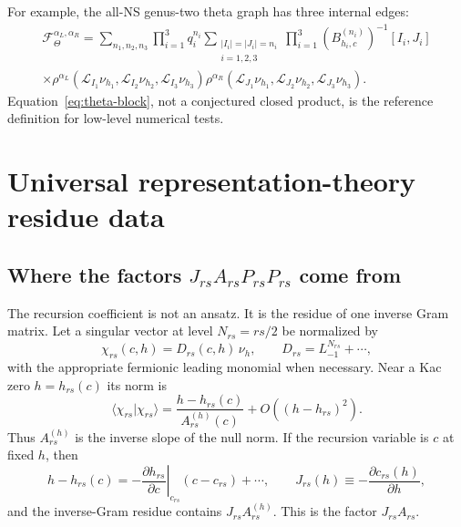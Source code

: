 \documentclass[11pt]{article}
\newcommand{\F}{\mathcal F}
\begin{document}
For example, the all-NS genus-two theta graph has three internal edges:
\begin{multline}
 \F_{\Theta}^{\alpha_L,\alpha_R}
 =\sum_{n_1,n_2,n_3}\prod_{i=1}^{3}q_i^{n_i}
 \sum_{\substack{|I_i|=|J_i|=n_i\\i=1,2,3}}
 \prod_{i=1}^{3}(B^{(n_i)}_{h_i,c})^{-1}[I_i,J_i]
 \\[-0.2em]
 \times\rho^{\alpha_L}
 (\mathcal L_{I_1}\nu_{h_1},
  \mathcal L_{I_2}\nu_{h_2},
  \mathcal L_{I_3}\nu_{h_3})
 \rho^{\alpha_R}
 (\mathcal L_{J_1}\nu_{h_1},
  \mathcal L_{J_2}\nu_{h_2},
  \mathcal L_{J_3}\nu_{h_3}).
 \label{eq:theta-block}
\end{multline}
Equation~\eqref{eq:theta-block}, not a conjectured closed product, is the
reference definition for low-level numerical tests.

\section{Universal representation-theory residue data}
\label{sec:degenerate}

\subsection{\texorpdfstring{Where the factors
$J_{rs}A_{rs}P_{rs}P_{rs}$ come from}{Origin of the J A P factors}}

The recursion coefficient is not an ansatz.  It is the residue of one inverse
Gram matrix.  Let a singular vector at level $N_{rs}=rs/2$ be normalized by
\begin{equation}
 \chi_{rs}(c,h)=D_{rs}(c,h)\,\nu_h,
 \qquad D_{rs}=L_{-1}^{N_{rs}}+\cdots,
 \label{eq:null-normalization}
\end{equation}
with the appropriate fermionic leading monomial when necessary.  Near a Kac
zero $h=h_{rs}(c)$ its norm is
\begin{equation}
 \langle\chi_{rs}|\chi_{rs}\rangle
 =\frac{h-h_{rs}(c)}{A^{(h)}_{rs}(c)}
 +O\!\left((h-h_{rs})^2\right).
 \label{eq:null-norm-slope}
\end{equation}
Thus $A^{(h)}_{rs}$ is the inverse slope of the null norm.  If the recursion
variable is $c$ at fixed $h$, then
\begin{equation}
 h-h_{rs}(c)
 =-\left.\frac{\partial h_{rs}}{\partial c}\right|_{c_{rs}}
 (c-c_{rs})+\cdots,
 \qquad
 J_{rs}(h)\equiv-\frac{\partial c_{rs}(h)}{\partial h},
 \label{eq:jacobian-origin}
\end{equation}
and the inverse-Gram residue contains $J_{rs}A^{(h)}_{rs}$.  This is the
factor $J_{rs}A_{rs}$.
\end{document}

